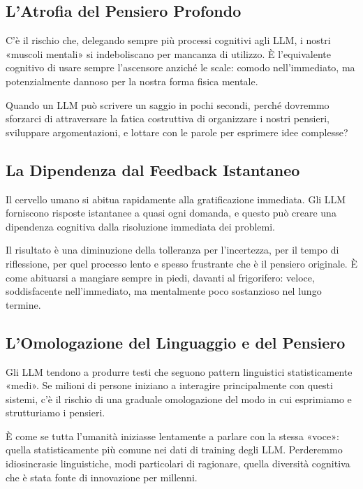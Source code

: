 \subsection{L'Atrofia del Pensiero Profondo}

C'è il rischio che, delegando sempre più processi cognitivi agli LLM, i nostri «muscoli mentali» si indeboliscano per mancanza di utilizzo. È l'equivalente cognitivo di usare sempre l'ascensore anziché le scale: comodo nell'immediato, ma potenzialmente dannoso per la nostra forma fisica mentale.

Quando un LLM può scrivere un saggio in pochi secondi, perché dovremmo sforzarci di attraversare la fatica costruttiva di organizzare i nostri pensieri, sviluppare argomentazioni, e lottare con le parole per esprimere idee complesse?

\subsection{La Dipendenza dal Feedback Istantaneo}

Il cervello umano si abitua rapidamente alla gratificazione immediata. Gli LLM forniscono risposte istantanee a quasi ogni domanda, e questo può creare una dipendenza cognitiva dalla risoluzione immediata dei problemi.

Il risultato è una diminuzione della tolleranza per l'incertezza, per il tempo di riflessione, per quel processo lento e spesso frustrante che è il pensiero originale. È come abituarsi a mangiare sempre in piedi, davanti al frigorifero: veloce, soddisfacente nell'immediato, ma mentalmente poco sostanzioso nel lungo termine.

\subsection{L'Omologazione del Linguaggio e del Pensiero}

Gli LLM tendono a produrre testi che seguono pattern linguistici statisticamente «medi». Se milioni di persone iniziano a interagire principalmente con questi sistemi, c'è il rischio di una graduale omologazione del modo in cui esprimiamo e strutturiamo i pensieri.

È come se tutta l'umanità iniziasse lentamente a parlare con la stessa «voce»: quella statisticamente più comune nei dati di training degli LLM. Perderemmo idiosincrasie linguistiche, modi particolari di ragionare, quella diversità cognitiva che è stata fonte di innovazione per millenni.

